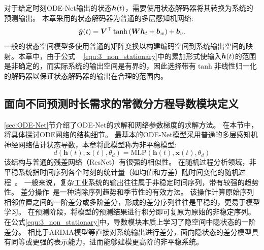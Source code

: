 对于给定时刻ODE-Net输出的状态$\boldsymbol h(t)$，需要使用状态解码器将其转换为系统的预测输出。
本章采用的状态解码器为普通的多层感知机网络:
\begin{equation}
    \hat{\boldsymbol y}(t) = \boldsymbol{V}^{\top} \tanh \left(\boldsymbol{W}\boldsymbol{h}_{t}+\boldsymbol{b}_{w}\right)+\boldsymbol b_{v}.
\end{equation}
一般的状态空间模型多使用普通的矩阵变换以构建编码空间到系统输出空间的映射。本章中，由于公式
~ \eqref{equ:3_non_stationary}中的累加形式使输入$\boldsymbol h(t)$的范围是非确定的，而实际系统的输出空间是有界的，因此选择带有$\tanh$非线性归一化的解码器以保证状态解码器的输出在合理的范围内。



\subsection{面向不同预测时长需求的常微分方程导数模块定义}
\label{sec:derivative}
\ref{sec:ODE-Net}节介绍了ODE-Net的求解和网络参数梯度的求解方法。
在本节中，将具体探讨ODE网络的结构细节。
最基本的ODE-Net模型采用普通的多层感知机神经网络估计状态导数\cite{chen2018neural}，本章将此模型称为非平稳模型:
\begin{equation}
\label{equ:3_non_stationary}
d\left(\boldsymbol{h}(t), \boldsymbol{x}(t), \theta_{d}\right)=\text{MLP}\left(\boldsymbol{h}(t), \boldsymbol{x}(t), \theta_{d}\right)
\end{equation}
该结构与普通的残差网络（ResNet）有很强的相似性。
在随机过程分析领域，非平稳系统指时间序列各个时刻的统计量（如均值和方差）随时间变化的随机过程~\cite{GUIDOLIN2018113}。
一般来说，复杂工业系统的输出往往属于非稳定时间序列，带有较强的趋势性。
差分操作~\cite{christoffersen2001forecasting}是一种消除序列趋势和季节性的有效方法。
该操作计算原始序列相邻位置之间的一阶差分或多阶差分，形成的差分序列往往是平稳的，更易于模型学习。
在预测阶段，将模型的预测结果进行积分即可复原为原始的非稳定序列。
在公式\eqref{equ:3_non_stationary}中，导数模块本质上学习了隐空间中隐状态的一阶差分。
相比于ARIMA模型等直接对系统输出进行差分，面向隐状态的差分模型具有同等或更强的表示能力，进而能够建模更高阶的非平稳系统。

